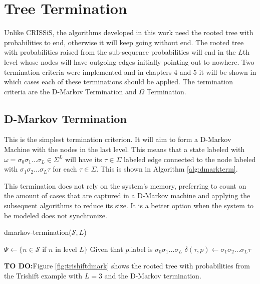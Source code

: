 {\section{Tree Termination\label{sec:treeterm}}

Unlike CRISSiS, the algorithms developed in this work need the rooted tree with probabilities to end, otherwise it will keep going without end. The rooted tree with probabilities raised from the sub-sequence probabilities will end in the $L$th level whose nodes will have outgoing edges initially pointing out to nowhere. Two termination criteria were implemented and in chapters 4 and 5 it will be shown in which cases each of these terminations should be applied. The termination criteria are the D-Markov Termination and $\Omega$ Termination.

\subsection{D-Markov Termination}

This is the simplest termination criterion. It will aim to form a D-Markov Machine with the nodes in the last level. This means that a state labeled with $\omega = \sigma_0\sigma_1\ldots\sigma_L \in \Sigma^L$ will have its $\tau \in \Sigma$ labeled edge connected to the node labeled with $\sigma_1\sigma_2\ldots\sigma_L\tau$ for each $\tau \in \Sigma$. This is shown in Algorithm \ref{alg:dmarkterm}.

This termination does not rely on the system's memory, preferring to count on the amount of cases that are captured in a D-Markov machine and applying the subsequent algorithms to reduce its size. It is a better option when the system to be modeled does not synchronize. 

  \begin{algorithm}
  \caption{dmarkov-termination($\mathcal{S}, L$)\label{alg:dmarkterm}}
    \begin{algorithmic}[1]
      	\State $\Psi \gets \{n \in \mathcal{S}$ if $n$ in level $L\}$
      		\State Given that $p$.label is $\sigma_0\sigma_1\ldots\sigma_L$
      		\For{$\tau \in \Sigma$}
      			\State $\delta(\tau, p) \gets \sigma_1\sigma_2\ldots\sigma_L\tau$
      		\EndFor
      	\EndFor
      \EndProcedure
    \end{algorithmic}
  \end{algorithm}
  
\textbf{TO DO:}Figure \ref{fig:trishiftdmark} shows the rooted tree with probabilities from the Trishift example with $L=3$ and the D-Markov termination.

}
